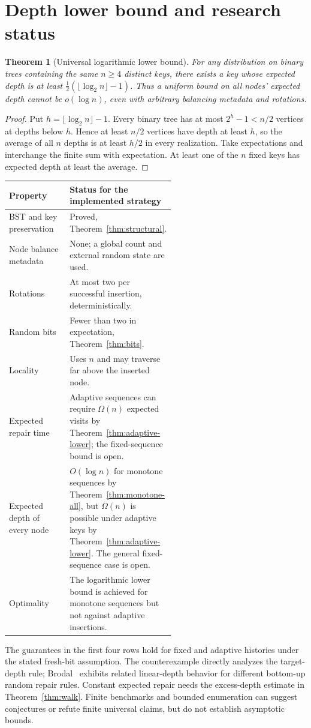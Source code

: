 \documentclass[11pt]{article}
\newtheorem{theorem}{Theorem}
\begin{document}
\section{Depth lower bound and research status}
\begin{theorem}[Universal logarithmic lower bound]\label{thm:lower}
For any distribution on binary trees containing the same $n\geq4$ distinct keys,
there exists a key whose expected depth is at least
$\frac12(\lfloor\log_2 n\rfloor-1)$. Thus a uniform bound on all nodes' expected
depth cannot be $o(\log n)$, even with arbitrary balancing metadata and rotations.
\end{theorem}
\begin{proof}
Put $h=\lfloor\log_2 n\rfloor-1$. Every binary tree has at most $2^h-1<n/2$
vertices at depths below $h$. Hence at least $n/2$ vertices have depth at least
$h$, so the average of all $n$ depths is at least $h/2$ in every realization.
Take expectations and interchange the finite sum with expectation. At least one
of the $n$ fixed keys has expected depth at least the average.
\end{proof}

\begin{center}
\begin{tabular}{@{}lp{0.55\linewidth}@{}}
\toprule
Property & Status for the implemented strategy \\
\midrule
BST and key preservation & Proved, Theorem~\ref{thm:structural}. \\
Node balance metadata & None; a global count and external random state are used. \\
Rotations & At most two per successful insertion, deterministically. \\
Random bits & Fewer than two in expectation, Theorem~\ref{thm:bits}. \\
Locality & Uses $n$ and may traverse far above the inserted node. \\
Expected repair time & Adaptive sequences can require $\Omega(n)$ expected visits by Theorem~\ref{thm:adaptive-lower}; the fixed-sequence bound is open. \\
Expected depth of every node & $O(\log n)$ for monotone sequences by Theorem~\ref{thm:monotone-all}, but $\Omega(n)$ is possible under adaptive keys by Theorem~\ref{thm:adaptive-lower}. The general fixed-sequence case is open. \\
Optimality & The logarithmic lower bound is achieved for monotone sequences but not against adaptive insertions. \\
\bottomrule
\end{tabular}
\end{center}
The guarantees in the first four rows hold for fixed and adaptive histories under
the stated fresh-bit assumption. The counterexample directly analyzes the
target-depth rule; Brodal~\cite{brodal} exhibits related linear-depth behavior
for different bottom-up random repair rules. Constant expected repair needs
the excess-depth estimate in Theorem~\ref{thm:walk}. Finite benchmarks and
bounded enumeration can suggest conjectures or refute finite universal claims,
but do not establish asymptotic bounds.
\end{document}
